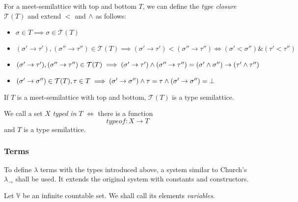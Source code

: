 \documentclass[main.tex]{subfiles}
\begin{document}
\begin{defn}
    For a meet-semilattice with top and bottom $T$, we can define the
    \emph{type closure} $\mathcal{T}(T)$ and extend $\less$ and $\wedge$ as follows:
    \begin{itemize}
        \item $\sigma \in T \implies \sigma \in \mathcal{T}(T)$
        \item $(\sigma' \rightarrow \tau'), (\sigma'' \rightarrow \tau'') \in
            \mathcal{T}(T) \implies
            (\sigma' \rightarrow \tau') \less (\sigma'' \rightarrow \tau'')
            \Leftrightarrow
            (\sigma' \less \sigma'') \& (\tau' \less \tau'')$
        \item $(\sigma' \rightarrow \tau'), (\sigma'' \rightarrow \tau'') \in
            \mathcal{T}(T) \implies
            (\sigma' \rightarrow \tau') \wedge (\sigma'' \rightarrow \tau'')
            =
            (\sigma' \wedge \sigma'') \rightarrow (\tau' \wedge \tau'')$
        \item $(\sigma' \rightarrow \sigma'') \in \mathcal{T}(T), \tau \in T
            \implies (\sigma' \rightarrow \sigma'') \wedge \tau
            = \tau \wedge (\sigma' \rightarrow \sigma'') = \bot$
    \end{itemize}
\end{defn}
\begin{prop}
    If $T$ is a meet-semilattice with top and bottom, $\mathcal{T}(T)$ is
    a type semilattice.
\end{prop}

\begin{defn}
    We call a set $X$ \emph{typed in} $T$ $\iff$ there is a function
    \[ typeof : X \rightarrow T \] and $T$ is a type semilattice.
\end{defn}

\subsubsection{Terms}
To define $\lambda$ terms with the types introduced above, a system similar
to Church's $\lambda_\rightarrow$ \cite[chap.~2.4]{ttfp} shall be used. It
extends the original system with constants and constructors.

\begin{defn}
    Let $\mathbb{V}$ be an infinite countable set. We shall call its elements
    \emph{variables}.
\end{defn}
\end{document}
